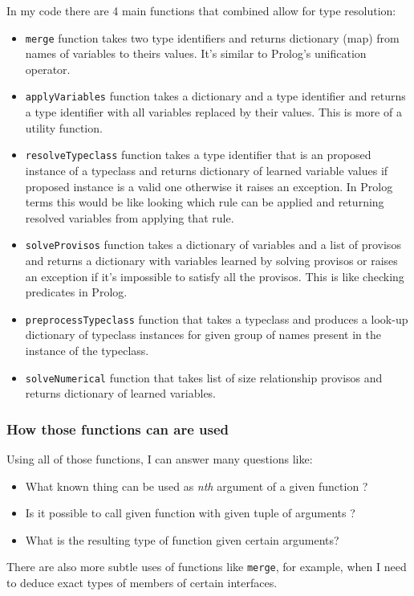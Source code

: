 \documentclass[12pt]{report}
\begin{document}
\newpage
\par
In my code there are 4 main functions that combined allow for type resolution:
\begin{itemize}
    \item \verb!merge! function takes two type identifiers and returns dictionary (map) from names of variables to theirs values. It's similar to Prolog's unification operator.
    \item \verb!applyVariables! function takes a dictionary and a type identifier and returns a type identifier with all variables replaced by their values. This is more of a utility function.
    \item \verb!resolveTypeclass! function takes a type identifier that is an proposed instance of a typeclass and returns dictionary of learned variable values if proposed instance is a valid one otherwise it raises an exception. In Prolog terms this would be like looking which rule can be applied and returning resolved variables from applying that rule.
    \item \verb!solveProvisos! function takes a dictionary of variables and a list of provisos and returns a dictionary with variables learned by solving provisos or raises an exception if it's impossible to satisfy all the provisos. This is like checking predicates in Prolog.
    \item \verb!preprocessTypeclass! function that takes a typeclass and produces a look-up dictionary of typeclass instances for given group of names present in the instance of the typeclass.
    \item \verb!solveNumerical! function that takes list of size relationship provisos and returns dictionary of learned variables.
\end{itemize}
\subsubsection{How those functions can are used}
Using all of those functions, I can answer many questions like:
\begin{itemize}
    \item What known thing can be used as \emph{nth} argument of a given function ?
    \item Is it possible to call given function with given tuple of arguments ?
    \item What is the resulting type of function given certain arguments?
\end{itemize}
There are also more subtle uses of functions like \verb!merge!, for example, when I need to deduce exact types of members of certain interfaces.
\end{document}
